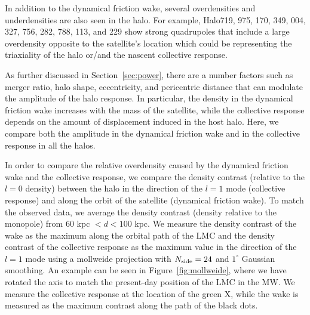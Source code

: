 \documentclass[twocolumn, linenumbers]{openjournal}
\begin{document}
In addition to the dynamical friction wake, several overdensities and underdensities 
are also seen in the halo. For example, Halo719, 975, 170, 349, 004, 327, 756, 282, 788, 113, and 229 
show strong quadrupoles that include a large overdensity opposite to the satellite's location 
which could be representing the triaxiality of the halo or/and the nascent collective response. 


As further discussed in Section~\ref{sec:power}, there are a number factors such as merger 
ratio, halo shape, eccentricity, and pericentric distance that can modulate the amplitude 
of the halo response. In particular, the density in the dynamical friction wake increases 
with the mass of the satellite,  while the collective response depends on the amount of 
displacement induced in the host halo.  Here, we compare both the amplitude in the dynamical 
friction wake and in the collective response in all the halos. 
 
In order to compare the relative overdensity caused by the dynamical friction wake and the 
collective response, we compare the density contrast (relative to the $l=0$ density) between 
the halo in the direction of the $l=1$ mode (collective response) and along the orbit of the 
satellite (dynamical friction wake). To match the observed data, we average the density contrast 
(density relative to the monopole) from $60$ kpc $< d < 100$ kpc. We measure the density contrast 
of the wake as the maximum along the orbital path of the LMC and the density contrast of the 
collective response as the maximum value in the direction of the $l=1$ mode using a mollweide 
projection with $N_{\rm side} = 24$ and $1^\circ$ Gaussian smoothing. An example can be seen in 
Figure~\ref{fig:mollweide}, where we have rotated the axis to match the present-day position of the 
LMC in the MW. We measure the collective response at the location of the green X, while the wake is 
measured as the maximum contrast along the path of the black dots.  
\end{document}
